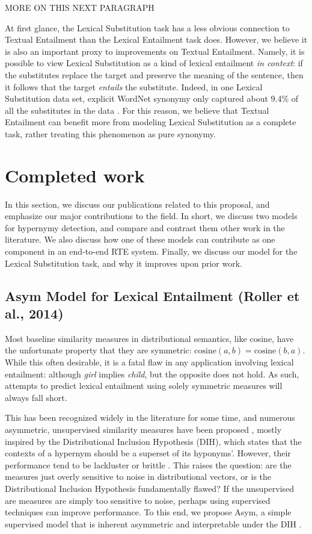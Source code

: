 \documentclass[12pt]{article}
\begin{document}
MORE ON THIS NEXT PARAGRAPH

At first glance, the Lexical Substitution task has a less obvious connection to
Textual Entailment than the Lexical Entailment task does. However, we believe
it is also an important proxy to improvements on Textual Entailment. Namely, it
is possible to view Lexical Substitution as a kind of lexical entailment {\em
in context}: if the substitutes replace the target and preserve the meaning of
the sentence, then it follows that the target {\em entails} the substitute.
Indeed, in one Lexical Substitution data set, explicit WordNet synonymy only
captured about 9.4\% of all the substitutes in the data
\cite{kremer:2014:eacl}. For this reason, we believe that Textual Entailment
can benefit more from modeling Lexical Substitution as a complete task, rather
treating this phenomenon as pure synonymy.

\section{Completed work}

In this section, we discuss our publications related to this
proposal, and emphasize our major contributions to the field. In short, we
discuss two models for hypernymy detection, and compare and contrast them other
work in the literature. We also discuss how one of these models can contribute
as one component in an end-to-end RTE system. Finally, we discuss our model for
the Lexical Substitution task, and why it improves upon prior work.

\subsection{Asym Model for Lexical Entailment (Roller et al., 2014)}
\label{sec:asym}

Most baseline similarity measures in distributional semantics, like cosine,
have the unfortunate property that they are symmetric: $\text{cosine}(a, b) =
\text{cosine}(b, a)$. While this often desirable, it
is a fatal flaw in any application involving lexical entailment: although {\em
girl} implies {\em child}, but the opposite does not hold. As such, attempts to
predict lexical entailment using solely symmetric measures will always fall
short.

This has been recognized widely in the
literature for some time, and numerous asymmetric, unsupervised similarity measures have been
proposed
\cite{weeds:2003:emnlp,zhitomirsky-geffet:2005:acl,clarke:2009:gems,kotlerman:2010:nle,santus:2013:thesis},
mostly inspired by the Distributional Inclusion Hypothesis (DIH), which
states that the contexts of a hypernym should be a superset of its hyponyms'.
However, their
performance tend to be lackluster \cite{clarke:2009:gems} or brittle
\cite{kotlerman:2010:nle}. This raises the question: are the measures just
overly sensitive to noise in distributional vectors, or is the Distributional
Inclusion Hypothesis fundamentally flawed? If the unsupervised are measures
are simply too sensitive to noise, perhaps using supervised techniques can
improve performance.  To this end, we propose Asym, a simple supervised model
that is inherent asymmetric and interpretable under the DIH
\cite{roller:2014:coling}. 
\end{document}

